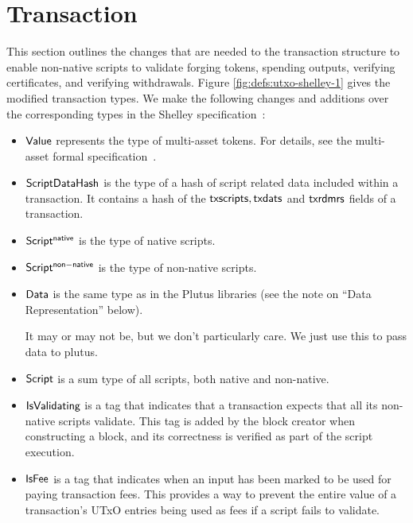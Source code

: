 \section{Transaction}
\label{sec:transactions}

This section outlines the changes that are needed to the transaction
structure to enable non-native scripts to validate
forging tokens, spending outputs, verifying certificates, and
verifying withdrawals.
%
Figure \ref{fig:defs:utxo-shelley-1} gives the modified transaction types.
We make the following changes and additions over the corresponding types in the
Shelley specification~\cite{XX}:

\begin{itemize}
  \item $\mathsf{Value}$ represents the type of multi-asset tokens. For details,
  see the multi-asset formal specification~\cite{XX}.

  \item $\mathsf{ScriptDataHash}$ is the type of a hash of script related data
    included within a transaction. It contains a hash of the $\mathsf{txscripts}, \mathsf{txdats}$
    and $\mathsf{txrdmrs}$ fields of a transaction.

  \item $\mathsf{Script^{native}}$ is the type of native scripts.

  \item $\mathsf{Script^{non-native}}$ is the type of non-native scripts.

  \item $\mathsf{Data}$ is the same type as in the Plutus libraries (see the note on ``Data Representation'' below).
    \begin{note}
      It may or may not be, but we don't particularly care. We just use this to pass data to plutus.
    \end{note}

  \item $\mathsf{Script}$ is a sum type of all scripts, both native and non-native.

  \item $\mathsf{IsValidating}$ is a tag that indicates that a transaction
  expects that all its non-native scripts validate.
  This tag is added by the block creator when
  constructing a block, and its correctness is verified as part of the script execution.

  \item $\mathsf{IsFee}$ is a tag that indicates when an input has been marked
    to be used for paying transaction fees.
    This provides a way to prevent
  the entire value of a transaction's UTxO entries being used as fees if a script fails to validate.


\end{itemize}
